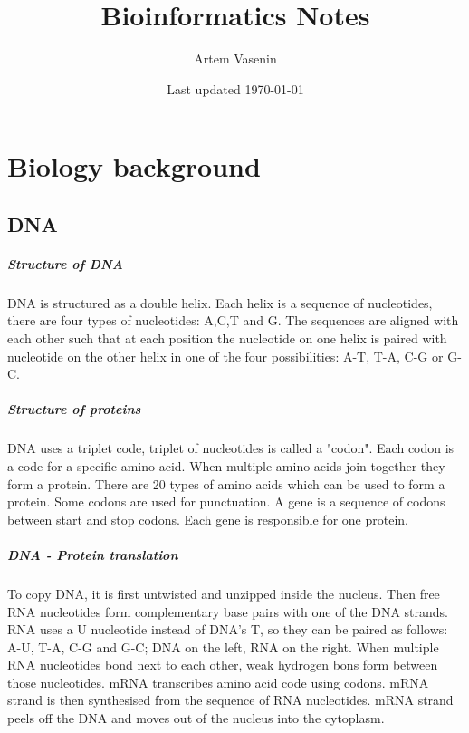 \documentclass{report}
\title{Bioinformatics Notes}
\author{Artem Vasenin}
\date{Last updated \today}
\begin{document}
\maketitle
\cleardoublepage
{}
\tableofcontents
\cleardoublepage
{}

\chapter{Biology background}
\section{DNA}
\paragraph{Structure of DNA}
DNA is structured as a double helix.
Each helix is a sequence of nucleotides, there are four types of nucleotides: A,C,T and G.
The sequences are aligned with each other such that at each position the nucleotide on one helix is paired with nucleotide on the other helix in one of the four possibilities: A-T, T-A, C-G or G-C.
\paragraph{Structure of proteins}
DNA uses a triplet code, triplet of nucleotides is called a "codon".
Each codon is a code for a specific amino acid.
When multiple amino acids join together they form a protein.
There are 20 types of amino acids which can be used to form a protein.
Some codons are used for punctuation.
A gene is a sequence of codons between start and stop codons.
Each gene is responsible for one protein.
\paragraph{DNA - Protein translation}
To copy DNA, it is first untwisted and unzipped inside the nucleus.
Then free RNA nucleotides form complementary base pairs with one of the DNA strands.
RNA uses a U nucleotide instead of DNA's T, so they can be paired as follows: A-U, T-A, C-G and G-C; DNA on the left, RNA on the right.
When multiple RNA nucleotides bond next to each other, weak hydrogen bons form between those nucleotides.
mRNA transcribes amino acid code using codons.
mRNA strand is then synthesised from the sequence of RNA nucleotides.
mRNA strand peels off the DNA and moves out of the nucleus into the cytoplasm.
\end{document}
